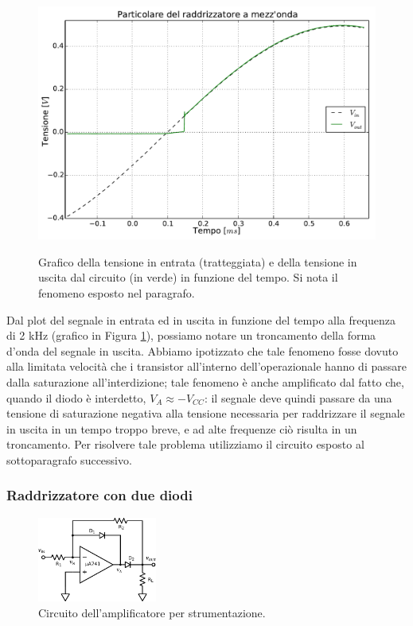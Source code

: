 \begin{figure}[ht]
 \centering
   {\includegraphics[width=14.5cm]{../E05/latex/zoom.pdf}}
 \caption{Grafico della tensione in entrata (tratteggiata) e della tensione in uscita dal circuito (in verde) in funzione del tempo. Si nota il fenomeno esposto nel paragrafo.}
 \label{gr5:problema}
\end{figure}

Dal plot del segnale in entrata ed in uscita in funzione del tempo alla frequenza di 2 \si{\kilo\hertz} (grafico in Figura \ref{gr5:problema}), possiamo notare un troncamento della forma d'onda del segnale in uscita. Abbiamo ipotizzato che tale fenomeno fosse dovuto alla limitata velocità che i transistor all'interno dell'operazionale hanno di passare dalla saturazione all'interdizione; tale fenomeno è anche amplificato dal fatto che, quando il diodo è interdetto, $V_{A} \approx -V_{CC}$: il segnale deve quindi passare da una tensione di saturazione negativa alla tensione necessaria per raddrizzare il segnale in uscita in un tempo troppo breve, e ad alte frequenze ciò risulta in un troncamento. Per risolvere tale problema utilizziamo il circuito esposto al sottoparagrafo successivo.

\subsubsection{Raddrizzatore con due diodi}

\begin{figure}
  \begin{center}
    \includegraphics[width=0.350\textwidth]{../E05/latex/c_rectifier_B.pdf}
  \end{center}
  \caption{Circuito dell'amplificatore per strumentazione.}
  \label{cir5:raddrizz_2}
\end{figure}

